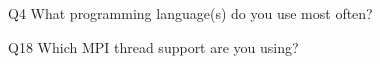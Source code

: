 \begin{description}%
\item{Q4} What programming language(s) do you use most often?%
\item{Q18} Which MPI thread support are you using?%
\end{description}%

